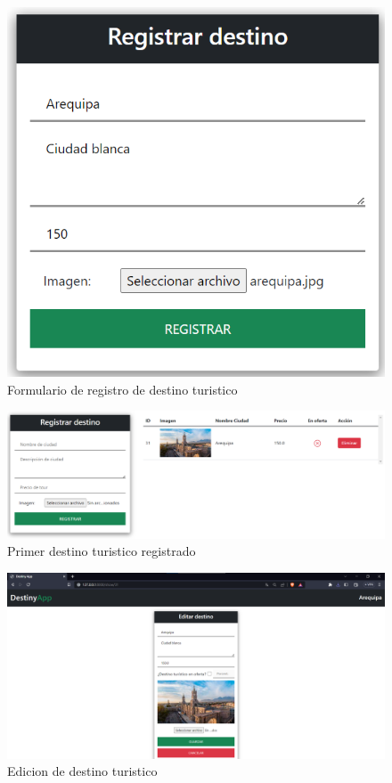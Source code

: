 \documentclass{article}
\begin{document}
        \begin{figure}
            \centering
            \includegraphics[width=150mm]{img/img3.png}
            \caption{Formulario de registro de destino turistico}
            \label{fig:enter-label}
        \end{figure}
        
        \begin{figure}
            \centering
            \includegraphics[width=150mm]{img/img4.png}
            \caption{Primer destino turistico registrado}
            \label{fig:enter-label}
        \end{figure}
        
        \begin{figure}
            \centering
            \includegraphics[width=150mm]{img/img5.png}
            \caption{Edicion de destino turistico}
            \label{fig:enter-label}
        \end{figure}
        
\end{document}
